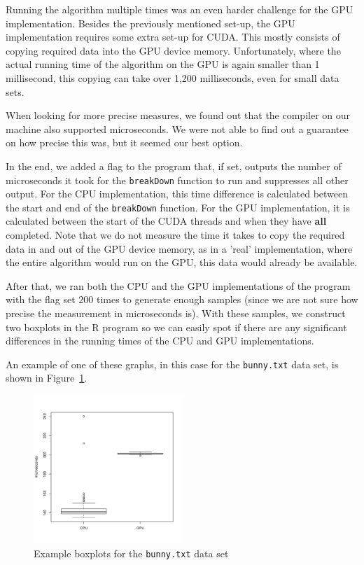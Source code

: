 Running the algorithm multiple times was an even harder challenge for the GPU implementation.
Besides the previously mentioned set-up, the GPU implementation requires some extra set-up for CUDA.
This mostly consists of copying required data into the GPU device memory.
Unfortunately, where the actual running time of the algorithm on the GPU is again smaller than 1 millisecond, this copying can take over 1,200 milliseconds, even for small data sets.

When looking for more precise measures, we found out that the compiler on our machine also supported microseconds.
We were not able to find out a guarantee on how precise this was, but it seemed our best option.

In the end, we added a flag to the program that, if set, outputs the number of microseconds it took for the \texttt{breakDown} function to run and suppresses all other output.
For the CPU implementation, this time difference is calculated between the start and end of the \texttt{breakDown} function.
For the GPU implementation, it is calculated between the start of the CUDA threads and when they have \textbf{all} completed.
Note that we do not measure the time it takes to copy the required data in and out of the GPU device memory, as in a 'real' implementation, where the entire algorithm would run on the GPU, this data would already be available.

After that, we ran both the CPU and the GPU implementations of the program with the flag set $200$ times to generate enough samples (since we are not sure how precise the measurement in microseconds is).
With these samples, we construct two boxplots in the R program so we can easily spot if there are any significant differences in the running times of the CPU and GPU implementations.

An example of one of these graphs, in this case for the \texttt{bunny.txt} data set, is shown in Figure~\ref{fig:bunny_box}.

\begin{figure}
	\center
	\includegraphics[width=0.5\textwidth]{results/bunny.pdf}
	\caption{Example boxplots for the \texttt{bunny.txt} data set}
	\label{fig:bunny_box}
\end{figure}

